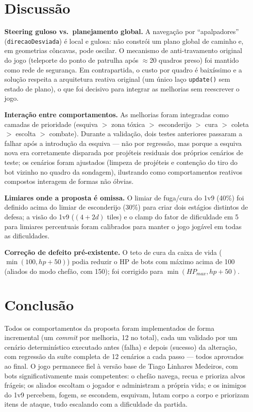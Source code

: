 \documentclass[a4paper,12pt]{article}
\begin{document}
\section{Discussão}

\textbf{Steering guloso vs.\ planejamento global.} A navegação por ``apalpadores''
(\texttt{direcaoDesviada}) é local e gulosa: não constrói um plano global de caminho e, em
geometrias côncavas, pode oscilar. O mecanismo de anti-travamento original do jogo
(teleporte do ponto de patrulha após $\approx$20 quadros preso) foi mantido como rede de
segurança. Em contrapartida, o custo por quadro é baixíssimo e a solução respeita a
arquitetura reativa original (um único laço \texttt{update()} sem estado de plano), o que
foi decisivo para integrar as melhorias sem reescrever o jogo.

\textbf{Interação entre comportamentos.} As melhorias foram integradas como camadas de
prioridade (esquiva $>$ zona tóxica $>$ esconderijo $>$ cura $>$ coleta $>$ escolta $>$
combate). Durante a validação, dois testes anteriores passaram a falhar após a introdução da
esquiva --- não por regressão, mas porque a esquiva nova era corretamente disparada por
projéteis residuais dos próprios cenários de teste; os cenários foram ajustados (limpeza de
projéteis e contenção do tiro do bot vizinho no quadro da sondagem), ilustrando como
comportamentos reativos compostos interagem de formas não óbvias.

\textbf{Limiares onde a proposta é omissa.} O limiar de fuga/cura do 1v9 (40\%) foi definido
acima do limiar de esconderijo (30\%) para criar dois estágios distintos de defesa; a visão
do 1v9 ($(4+2d)$ tiles) e o clamp do fator de dificuldade em 5 para limiares percentuais
foram calibrados para manter o jogo jogável em todas as dificuldades.

\textbf{Correção de defeito pré-existente.} O teto de cura da caixa de vida
($\min(100, hp+50)$) podia reduzir o HP de bots com máximo acima de 100 (aliados do modo
chefão, com 150); foi corrigido para $\min(HP_{max}, hp+50)$.

\section{Conclusão}

Todos os comportamentos da proposta foram implementados de forma incremental (um
\textit{commit} por melhoria, 12 no total), cada um validado por um cenário determinístico
executado antes (falha) e depois (sucesso) da alteração, com regressão da suíte completa de
12 cenários a cada passo --- todos aprovados ao final. O jogo permanece fiel à versão base de
Tiago Linhares Medeiros, com bots significativamente mais competentes: o chefão navega,
recua e prioriza alvos frágeis; os aliados escoltam o jogador e administram a própria vida; e
os inimigos do 1v9 percebem, fogem, se escondem, esquivam, lutam corpo a corpo e priorizam
itens de ataque, tudo escalando com a dificuldade da partida.

\appendix
\end{document}
